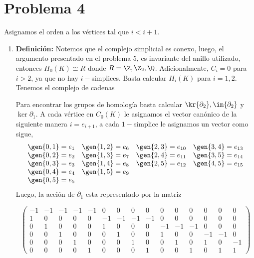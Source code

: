 \documentclass{article}
\begin{document}
\section*{Problema 4}
\noindent Asignamos el orden a los vértices tal que $i<i+1$.
\begin{enumerate}
    \item\textbf{Definición:} Notemos que el complejo simplicial es conexo, luego, el 
    argumento presentado en el problema 5, es invariante del anillo utilizado, entonces 
    $H_{0}(K)\cong R$ donde $R=\Z,\Z_{2},\Q$. Adicionalmente, $C_{i}=0$ para $i>2$, ya que no hay
    $i-$simplices. Basta calcular $H_{i}(K)$ para $i=1,2$. Tenemos el complejo de cadenas

    \vspace{2mm}
    \centerline{
    }
    Para encontrar los grupos de homología basta calcular $\kr{\partial_{2}},\im{\partial_{2}}$ y
    $\ker{\partial_{1}}$. A cada vértice en $C_{0}(K)$ le asignamos el vector canónico de la 
    siguiente manera $i=e_{i+1}$, a cada $1-$simplice le asignamos un vector como sigue,
    \begin{equation*}
        \begin{array}{llll}
            \gen{0,1}=e_{1} & \gen{1,2}=e_{6} & \gen{2,3}=e_{10} & \gen{3,4}=e_{13} \\
            \gen{0,2}=e_{2} & \gen{1,3}=e_{7} & \gen{2,4}=e_{11} & \gen{3,5}=e_{14} \\
            \gen{0,3}=e_{3} & \gen{1,4}=e_{8} & \gen{2,5}=e_{12} & \gen{4,5}=e_{15} \\
            \gen{0,4}=e_{4} & \gen{1,5}=e_{9} \\
            \gen{0,5}=e_{5}
        \end{array}
    \end{equation*}
    Luego, la acción de $\partial_{1}$ esta representado por la matriz
    
    \vspace{1mm}
    \begin{equation*}
        \begin{pmatrix}
            -1 & -1 & -1 & -1 & -1 & 0 & 0 & 0 & 0 & 0 & 0 & 0 & 0 & 0 & 0 \\
            1 & 0 & 0 & 0 & 0 & -1 & -1 & -1 & -1 & 0 & 0 & 0 & 0 & 0 & 0 \\
            0 & 1 & 0 & 0 & 0 & 1 & 0 & 0 & 0 & -1 & -1 & -1 & 0 & 0 & 0 \\
            0 & 0 & 1 & 0 & 0 & 0 & 1 & 0 & 0 & 1 & 0 & 0 & -1 & -1 & 0 \\
            0 & 0 & 0 & 1 & 0 & 0 & 0 & 1 & 0 & 0 & 1 & 0 & 1 & 0 & -1 \\
            0 & 0 & 0 & 0 & 1 & 0 & 0 & 0 & 1 & 0 & 0 & 1 & 0 & 1 & 1
        \end{pmatrix}
    \end{equation*}


\end{enumerate}
\end{document}
